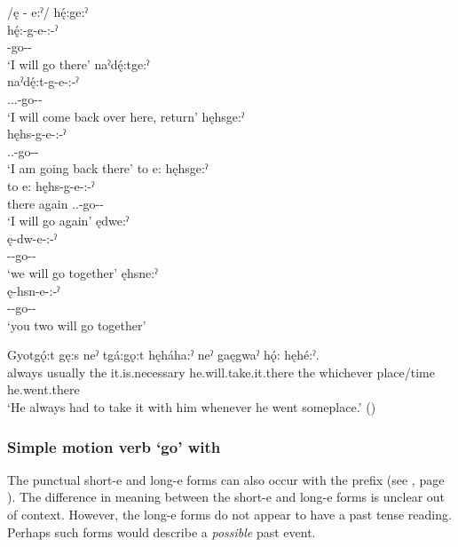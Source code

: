 \ea\label{ex:simplemotex14} /ę - e:ˀ/
\ea hę́:ge:ˀ\\
\gll hę́:-g-e-:-ˀ\\
 {\translocativefuture}-go-{\purposive}-{\punctual}\\
\glt `I will go there'
\ex naˀdę́:tge:ˀ\\
\gll naˀdę́:t-g-e-:-ˀ\\
 {\partitive.\dualic.\future.\cislocative}-go-{\purposive}-{\punctual}\\
\glt `I will come back over here, return'
\ex hęhsge:ˀ\\
\gll hęhs-g-e-:-ˀ\\
 {\translocative.\future.\repetitive}-go-{\purposive}-{\punctual}\\
\glt `I am going back there'
\ex to e: hęhsge:ˀ\\
\gll to e: hęhs-g-e-:-ˀ\\
there again {\translocative.\future.\repetitive}-go-{\purposive}-{\punctual}\\
\glt `I will go again'
\newpage
\ex ędwe:ˀ\\
\gll ę-dw-e-:-ˀ\\
 \fut--go-{\purposive}-{\punctual}\\
\glt `we will go together'
\ex ęhsne:ˀ\\
\gll ę-hsn-e-:-ˀ\\
 \fut--go-{\purposive}-{\punctual} \\
\glt `you two will go together'
\z
\z

\ea\label{ex:simplemotex140} 
\gll Gyotgǫ́:t gę:s neˀ tgá:gǫ:t hęháha:ˀ neˀ gaęgwaˀ hǫ́: hęhé:ˀ. \\
always usually the it.is.necessary he.will.take.it.there the whichever place/time he.went.there \\
\glt ‘He always had to take it with him whenever he went someplace.’ (\cite{henry_de_2005})
\z

\subsubsection*{Simple motion verb  ‘go’ with  \textsc{\indefinite}}
The punctual short-e  and long-e  forms can also occur with the  \textsc{\indefinite} prefix (see , page \pageref{figtab:1:purposiveasp}). The difference in meaning between the short-e  and long-e  forms is unclear out of context. However, the long-e forms do not appear to have a past tense reading. Perhaps such forms would describe a \emph{possible} past event.

